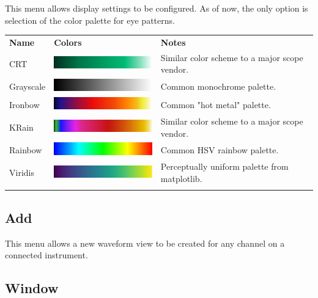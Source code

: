 This menu allows display settings to be configured. As of now, the only option is selection of the color palette for
eye patterns.

\begin{tabularx}{16cm}{llX}
\thickhline
\textbf{Name} & \textbf{Colors} & \textbf{Notes} \\
\thickhline
CRT & \includegraphics[width=5cm]{images/eye-gradient-crt.png} & Similar color scheme to a major scope vendor.\\
Grayscale & \includegraphics[width=5cm]{images/eye-gradient-grayscale.png} & Common monochrome palette.\\
Ironbow & \includegraphics[width=5cm]{images/eye-gradient-ironbow.png} & Common "hot metal" palette. \\
KRain & \includegraphics[width=5cm]{images/eye-gradient-krain.png} & Similar color scheme to a major scope vendor.\\
Rainbow & \includegraphics[width=5cm]{images/eye-gradient-rainbow.png} & Common HSV rainbow palette. \\
Viridis & \includegraphics[width=5cm]{images/eye-gradient-viridis.png} & Perceptually uniform palette from matplotlib. \\
\thickhline
\end{tabularx}

\subsection{Add}

This menu allows a new waveform view to be created for any channel on a connected instrument.

\subsection{Window}

